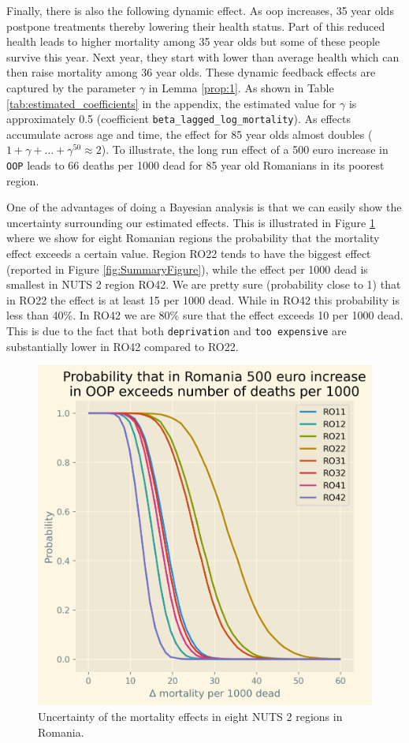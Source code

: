 \documentclass[a4paper,12pt]{article}
\begin{document}
Finally, there is also the following dynamic effect. As oop increases, 35 year olds postpone treatments thereby lowering their health status. Part of this reduced health leads to higher mortality among 35 year olds but some of these people survive this year. Next year, they start with lower than average health which can then raise mortality among 36 year olds. These dynamic feedback effects are captured by the parameter \(\gamma\) in Lemma \ref{prop:1}. As shown in Table \ref{tab:estimated_coefficients} in the appendix, the estimated value for \(\gamma\) is approximately 0.5 (coefficient \texttt{beta\_lagged\_log\_mortality}). As effects accumulate across age and time, the effect for 85 year olds almost doubles (\(1+\gamma+...+\gamma^{50} \approx 2\)). To illustrate, the long run effect of a 500 euro increase in \texttt{OOP} leads to 66 deaths per 1000 dead for 85 year old Romanians in its poorest region.

One of the advantages of doing a Bayesian analysis is that we can easily show the uncertainty surrounding our estimated effects. This is illustrated in Figure \ref{fig:EffectRO} where we show for eight Romanian regions the probability that the mortality effect exceeds a certain value. Region RO22 tends to have the biggest effect (reported in Figure \ref{fig:SummaryFigure}), while the effect per 1000 dead is smallest in NUTS 2 region RO42. We are pretty sure (probability close to 1) that in RO22 the effect is at least 15 per 1000 dead. While in RO42 this probability is less than 40\%. In RO42 we are 80\% sure that the effect exceeds 10 per 1000 dead. This is due to the fact that both \texttt{deprivation} and \texttt{too expensive} are substantially lower in RO42 compared to RO22.

\begin{figure}[htbp]
\centering
\includegraphics[width=.9\linewidth]{./figures/Effect_RO.png}
\caption{\label{fig:EffectRO}Uncertainty of the mortality effects in eight NUTS 2 regions in Romania.}
\end{figure}
\end{document}
